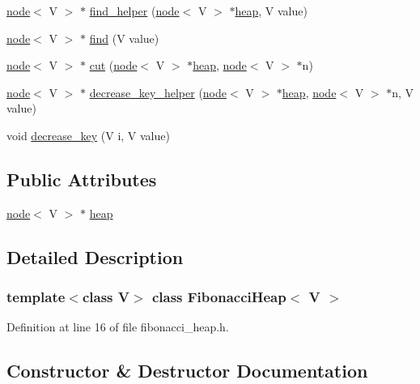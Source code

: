 \begin{DoxyCompactItemize}
\hyperlink{structnode}{node}$<$ V $>$ $\ast$ \hyperlink{class_fibonacci_heap_a215c1e3fbf82b73f7548ef9b2e4420e3}{find\+\_\+helper} (\hyperlink{structnode}{node}$<$ V $>$ $\ast$\hyperlink{class_fibonacci_heap_a13c58cd79d84a4398fb9fb1c956ccfc5}{heap}, V value)
\item 
\hyperlink{structnode}{node}$<$ V $>$ $\ast$ \hyperlink{class_fibonacci_heap_ae6083007b440bd41d8adbd44c9bb7636}{find} (V value)
\item 
\hyperlink{structnode}{node}$<$ V $>$ $\ast$ \hyperlink{class_fibonacci_heap_a6777625b9569bd48fcefa848d7a8812a}{cut} (\hyperlink{structnode}{node}$<$ V $>$ $\ast$\hyperlink{class_fibonacci_heap_a13c58cd79d84a4398fb9fb1c956ccfc5}{heap}, \hyperlink{structnode}{node}$<$ V $>$ $\ast$n)
\item 
\hyperlink{structnode}{node}$<$ V $>$ $\ast$ \hyperlink{class_fibonacci_heap_ab97deb5ff0e3944eba71a1ba5d99d2b6}{decrease\+\_\+key\+\_\+helper} (\hyperlink{structnode}{node}$<$ V $>$ $\ast$\hyperlink{class_fibonacci_heap_a13c58cd79d84a4398fb9fb1c956ccfc5}{heap}, \hyperlink{structnode}{node}$<$ V $>$ $\ast$n, V value)
\item 
void \hyperlink{class_fibonacci_heap_a36e1518c83aa296c0c8b9a6e4cfb42d6}{decrease\+\_\+key} (V i, V value)
\end{DoxyCompactItemize}
\subsection*{Public Attributes}
\begin{DoxyCompactItemize}
\item 
\hyperlink{structnode}{node}$<$ V $>$ $\ast$ \hyperlink{class_fibonacci_heap_a13c58cd79d84a4398fb9fb1c956ccfc5}{heap}
\end{DoxyCompactItemize}


\subsection{Detailed Description}
\subsubsection*{template$<$class V$>$\newline
class Fibonacci\+Heap$<$ V $>$}



Definition at line 16 of file fibonacci\+\_\+heap.\+h.



\subsection{Constructor \& Destructor Documentation}
\mbox{\label{class_fibonacci_heap_ab59b6ac11eaf6f956b4e3db7d8c3c472}} 
